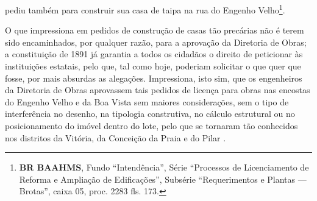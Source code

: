 pediu também para construir sua casa de taipa na rua do Engenho Velho\footnote{\textbf{BR BAAHMS}, Fundo ``Intendência'', Série ``Processos de Licenciamento de Reforma e Ampliação de Edificações'', Subsérie ``Requerimentos e Plantas --- Brotas'', caixa 05, proc. 2283 fls. 173.}. 

O que impressiona em pedidos de construção de casas tão precárias não é terem sido encaminhados, por qualquer razão, para a aprovação da Diretoria de Obras; a constituição de 1891 já garantia a todos os cidadãos o direito de peticionar às instituições estatais, pelo que, tal como hoje, poderiam solicitar o que quer que fosse, por mais absurdas as alegações. Impressiona, isto sim, que os engenheiros da Diretoria de Obras aprovassem tais pedidos de licença para obras nas encostas do Engenho Velho e da Boa Vista sem maiores considerações, sem o tipo de interferência no desenho, na tipologia construtiva, no cálculo estrutural ou no posicionamento do imóvel dentro do lote, pelo que se tornaram tão conhecidos nos distritos da Vitória, da Conceição da Praia e do Pilar \cite{almeida_victoria_1997,almeida_vitrinescomercio_2014}. 

